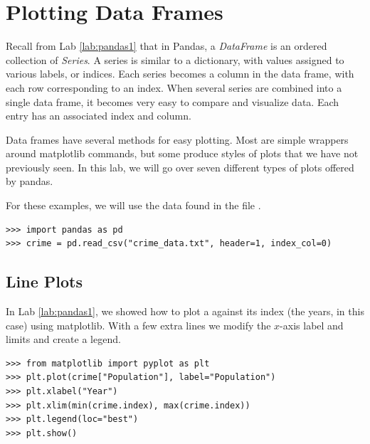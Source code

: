\label{lab:pandas2}

\section*{Plotting Data Frames}

Recall from Lab \ref{lab:pandas1} that in Pandas, a \emph{DataFrame} is an ordered collection of \emph{Series}.
A series is similar to a dictionary, with values assigned to various labels, or indices. Each series becomes a column in the data frame, with each row corresponding to an index.
When several series are combined into a single data frame, it becomes very easy to compare and visualize data.  Each entry has an associated index and column.

Data frames have several methods for easy plotting.
Most are simple wrappers around matplotlib commands, but some produce styles of plots that we have not previously seen.  In this lab, we will go over seven different types of plots offered by pandas.

For these examples, we will use the data found in the file .

\begin{lstlisting}
>>> import pandas as pd
>>> crime = pd.read_csv("crime_data.txt", header=1, index_col=0)
\end{lstlisting}

\subsection*{Line Plots}

In Lab \ref{lab:pandas1}, we showed how to plot a  against its index (the years, in this case) using matplotlib.
With a few extra lines we modify the $x$-axis label and limits and create a legend.

\begin{lstlisting}
>>> from matplotlib import pyplot as plt
>>> plt.plot(crime["Population"], label="Population")
>>> plt.xlabel("Year")
>>> plt.xlim(min(crime.index), max(crime.index))
>>> plt.legend(loc="best")
>>> plt.show()
\end{lstlisting}

